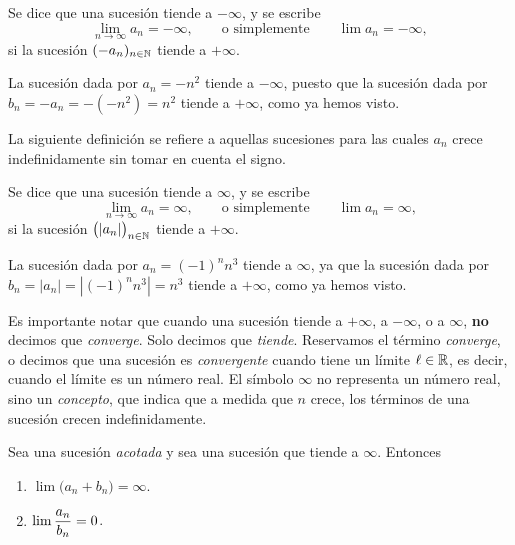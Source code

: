 \begin{definition}
    Se dice que una sucesión \sucan tiende a $-\infty$, y se escribe
    \[
    \lim_{n\to\infty} a_n = -\infty,
    \qquad\text{o simplemente}\qquad
    \lim a_n = -\infty,
    \]
    si la sucesión $(-a_n)_{{n\in\mathbb{N}}}$ tiende a $+\infty$.
\end{definition}

\begin{example}
    La sucesión dada por $a_n = -n^2$ tiende a $-\infty$, puesto que la sucesión dada por $b_n = -a_n = -(-n^2) = n^2$ tiende a $+\infty$, como ya hemos visto.
\end{example}

La siguiente definición se refiere a aquellas sucesiones para las cuales $a_n$ crece indefinidamente sin tomar en cuenta el signo.

\begin{definition}
    Se dice que una sucesión \sucan tiende a $\infty$, y se escribe
    \[
    \lim_{n\to\infty} a_n = \infty,
    \qquad\text{o simplemente}\qquad
    \lim a_n = \infty,
    \]
    si la sucesión $\big(|a_n|\big)_{{n\in\mathbb{N}}}$ tiende a $+\infty$.
\end{definition}

\begin{example}
    La sucesión dada por $a_n=(-1)^n n^3$ tiende a $\infty$, ya que la sucesión dada por $b_n = |a_n| = |(-1)^n n^3| = n^3$ tiende a $+\infty$, como ya hemos visto.
\end{example}


\begin{remark}
    Es importante notar que cuando una sucesión tiende a $+\infty$, a $-\infty$, o a $\infty$, \textbf{no} decimos que \emph{converge}. Solo decimos que \emph{tiende}.
    Reservamos el término \emph{converge}, o decimos que una sucesión es \emph{convergente} cuando tiene un límite $\ell\in\mathbb{R}$, es decir, cuando el límite es un número real. El símbolo $\infty$ no representa un número real, sino un \emph{concepto}, que indica que a medida que $n$ crece, los términos de una sucesión crecen indefinidamente.
\end{remark}

\begin{proposition}\label{P:suc lim suma cociente infinito}
    Sea \sucan una sucesión \emph{acotada} y sea \sucbn una sucesión que tiende a $\infty$. Entonces
    \begin{enumerate}[{\rm (a)}]
        \item $\lim \big(a_n+b_n) = \infty$.
        \item $\displaystyle\lim \frac{a_n}{b_n} = 0$.
    \end{enumerate}
\end{proposition}

